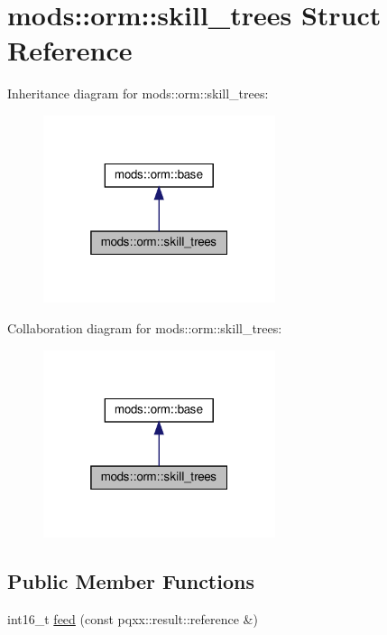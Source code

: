 \hypertarget{structmods_1_1orm_1_1skill__trees}{}\section{mods\+:\+:orm\+:\+:skill\+\_\+trees Struct Reference}
\label{structmods_1_1orm_1_1skill__trees}


Inheritance diagram for mods\+:\+:orm\+:\+:skill\+\_\+trees\+:\nopagebreak
\begin{figure}[H]
\begin{center}
\leavevmode
\includegraphics[width=193pt]{structmods_1_1orm_1_1skill__trees__inherit__graph}
\end{center}
\end{figure}


Collaboration diagram for mods\+:\+:orm\+:\+:skill\+\_\+trees\+:\nopagebreak
\begin{figure}[H]
\begin{center}
\leavevmode
\includegraphics[width=193pt]{structmods_1_1orm_1_1skill__trees__coll__graph}
\end{center}
\end{figure}
\subsection*{Public Member Functions}
\begin{DoxyCompactItemize}
\item 
int16\+\_\+t \hyperlink{structmods_1_1orm_1_1skill__trees_af014042f1e7b8c873dcb08135e744b8a}{feed} (const pqxx\+::result\+::reference \&)
\end{DoxyCompactItemize}
